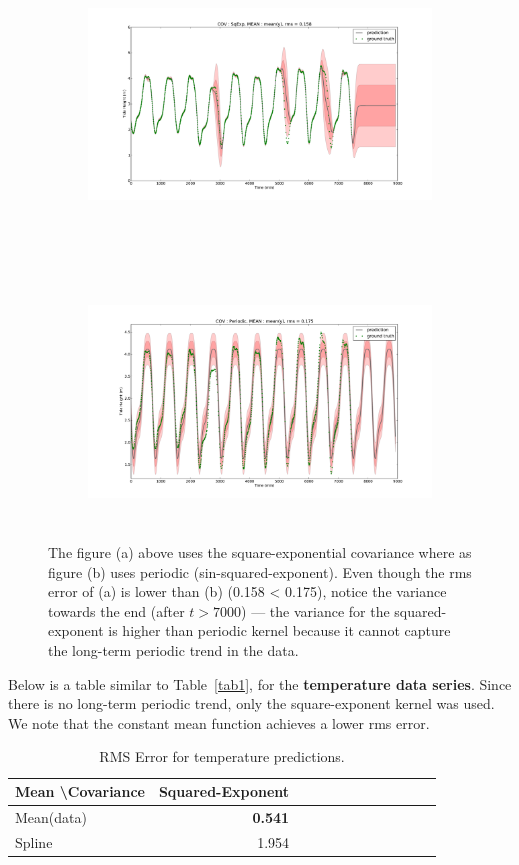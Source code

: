 \documentclass[11pt]{report}
\begin{document}
\begin{figure}[h]
\begin{subfigure}[h]{\linewidth}
\includegraphics[width=15cm, height=6.5cm]{figs/h_sqexp_const.pdf}
\caption{}
\end{subfigure}\\
\begin{subfigure}[h]{\linewidth}
\includegraphics[width=15cm, height=6.5cm]{figs/h_per_const.pdf}
\caption{}
\end{subfigure}%
\caption[]{The figure (a) above uses the square-exponential covariance where as figure (b) uses periodic (sin-squared-exponent). Even though the rms error of (a) is lower than (b) (0.158 < 0.175), notice the variance towards the end (after $t>7000$) --- the variance for the squared-exponent is higher than periodic kernel because it cannot capture the long-term periodic trend in the data.}
\label{fig:f1}
\end{figure}
\clearpage

Below is a table similar to Table~\ref{tab1}, for the \textbf{temperature data series}. Since there is no long-term periodic trend, only the square-exponent kernel was used. We note that the constant mean function achieves a lower rms error.

\begin{table}[b]
\begin{center}
\begin{tabular}{|l||r|r|r|r|r|r|r|r|r|r|r|}
\hline
Mean \textbackslash Covariance & Squared-Exponent \\\hline\hline
Mean(data) & \textbf{0.541} \\\hline
Spline     & 1.954\\\hline
\end{tabular}
\caption{RMS Error for temperature predictions.}
\label{tab2}
\end{center}
\end{table}
\end{document}
